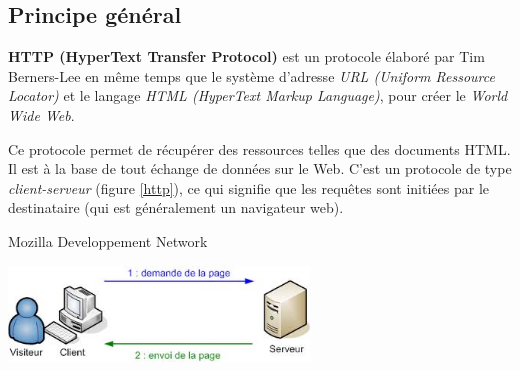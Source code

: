 \documentclass[a4paper,11pt]{article}
\begin{document}
\begin{Form}
\subsection{Principe général}
\textbf{HTTP (HyperText Transfer Protocol)} est un protocole élaboré par Tim Berners-Lee en même temps que le système d'adresse \emph{URL (Uniform Ressource Locator)} et le langage \emph{HTML (HyperText Markup Language)}, pour créer le \emph{World Wide Web}.
\begin{aretenir}[]
Ce protocole permet de récupérer des ressources telles que des documents HTML. Il est à la base de tout échange de données sur le Web. C'est un protocole de type \emph{client-serveur} (figure \ref{http}), ce qui signifie que les requêtes sont initiées par le destinataire (qui est généralement un navigateur web).
\begin{flushright}
\scriptsize{Mozilla Developpement Network}
\end{flushright}
\end{aretenir}
\begin{center}
\centering
\includegraphics[width=8cm]{ressources/http.jpeg}
\label{http}
\end{center}

\end{Form}
\end{document}
